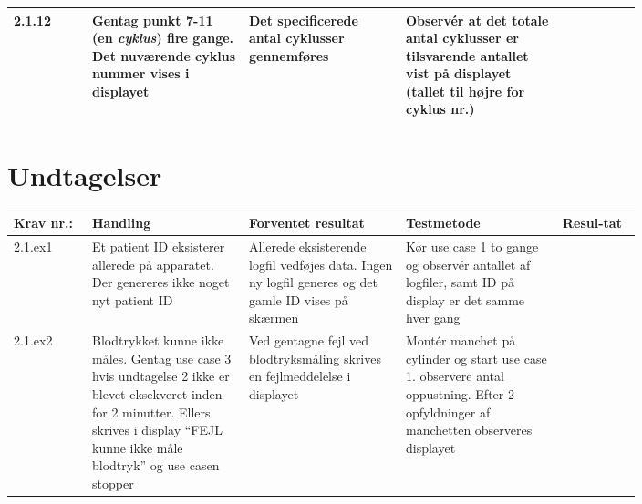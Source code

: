 \begin{longtable}{|p{0.1\linewidth}|p{0.2\linewidth}|p{0.2\linewidth}|p{0.2\linewidth}|p{0.1\linewidth}|}
			2.1.12& Gentag punkt 7-11 (en \textit{cyklus}) fire gange. Det nuværende cyklus nummer vises i displayet & Det specificerede antal cyklusser gennemføres & Observér at det totale antal cyklusser er tilsvarende antallet vist på displayet (tallet til højre for cyklus nr.) &  \\ \hline 
		\end{longtable}

		\section*{Undtagelser}
			\begin{longtable}{|p{0.1\linewidth}|p{0.2\linewidth}|p{0.2\linewidth}|p{0.2\linewidth}|p{0.1\linewidth}|}
				\hline
									\rowcolor{usDef}
				Krav nr.: & Handling & Forventet resultat & Testmetode & Resul-tat  \\\hline
				2.1.ex1 & Et patient ID eksisterer allerede på apparatet. Der genereres ikke noget nyt patient ID & Allerede eksisterende logfil vedføjes data. Ingen ny logfil generes og det gamle ID vises på skærmen & Kør use case 1 to gange og observér antallet af logfiler, samt ID på display er det samme hver gang &  \\
				\hline
				2.1.ex2 & Blodtrykket kunne ikke måles. Gentag use case 3 hvis undtagelse 2 ikke er blevet eksekveret inden for 2 minutter. Ellers skrives i display “FEJL kunne ikke måle blodtryk” og use casen stopper  & Ved gentagne fejl ved blodtryksmåling skrives en fejlmeddelelse i displayet & Montér manchet på cylinder og start use case 1. observere antal oppustning. Efter 2 opfyldninger af manchetten observeres displayet & \\ \hline
			\end{longtable}